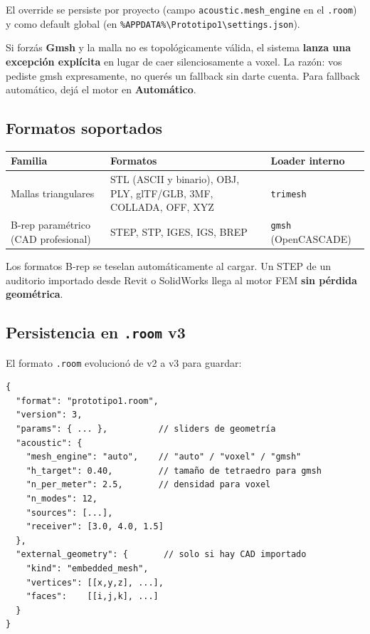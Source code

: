 \documentclass[11pt, a4paper]{article}
\newenvironment{atención}[1][Atención]{%
  \begin{tcolorbox}[mybox=cOrange, title={#1}]%
}{\end{tcolorbox}}
\begin{document}
El override se persiste por proyecto (campo \texttt{acoustic.mesh\_engine}
en el \texttt{.room}) y como default global (en
\texttt{\%APPDATA\%\textbackslash Prototipo1\textbackslash settings.json}).

\begin{atención}[Override "Gmsh" + fallo de gmsh]
Si forzás \textbf{Gmsh} y la malla no es topológicamente válida, el sistema
\textbf{lanza una excepción explícita} en lugar de caer silenciosamente a
voxel. La razón: vos pediste gmsh expresamente, no querés un fallback sin
darte cuenta. Para fallback automático, dejá el motor en \textbf{Automático}.
\end{atención}

\subsection{Formatos soportados}

\begin{tabular}{p{4cm}p{7cm}p{3.5cm}}
  \toprule
  \textbf{Familia} & \textbf{Formatos} & \textbf{Loader interno} \\
  \midrule
  Mallas triangulares
    & STL (ASCII y binario), OBJ, PLY, glTF/GLB, 3MF, COLLADA, OFF, XYZ
    & \texttt{trimesh} \\
  B-rep paramétrico (CAD profesional)
    & STEP, STP, IGES, IGS, BREP
    & \texttt{gmsh} (OpenCASCADE) \\
  \bottomrule
\end{tabular}

\vspace{0.4em}
Los formatos B-rep se teselan automáticamente al cargar. Un STEP de un
auditorio importado desde Revit o SolidWorks llega al motor FEM
\textbf{sin pérdida geométrica}.

\subsection{Persistencia en \texttt{.room} v3}

El formato \texttt{.room} evolucionó de v2 a v3 para guardar:

\begin{verbatim}
{
  "format": "prototipo1.room",
  "version": 3,
  "params": { ... },          // sliders de geometría
  "acoustic": {
    "mesh_engine": "auto",    // "auto" / "voxel" / "gmsh"
    "h_target": 0.40,         // tamaño de tetraedro para gmsh
    "n_per_meter": 2.5,       // densidad para voxel
    "n_modes": 12,
    "sources": [...],
    "receiver": [3.0, 4.0, 1.5]
  },
  "external_geometry": {       // solo si hay CAD importado
    "kind": "embedded_mesh",
    "vertices": [[x,y,z], ...],
    "faces":    [[i,j,k], ...]
  }
}
\end{verbatim}
\end{document}
